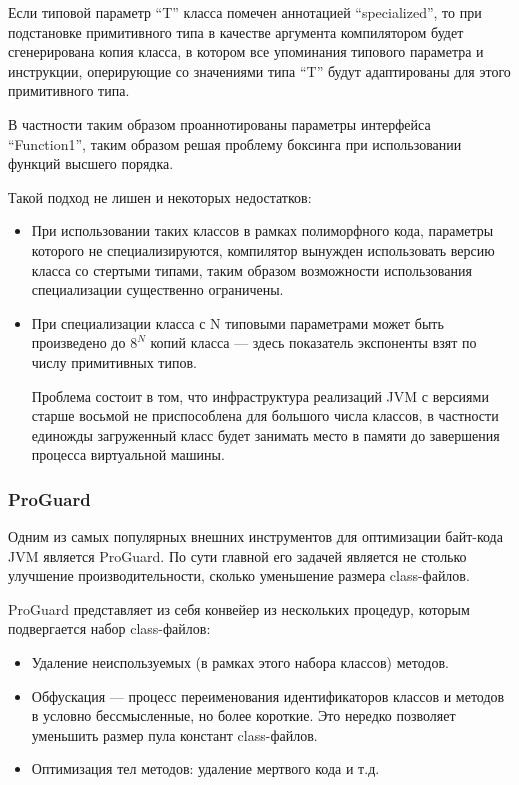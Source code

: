 Если типовой параметр ``T'' класса помечен аннотацией ``specialized'', то при подстановке
примитивного типа в качестве аргумента компилятором будет сгенерирована копия класса, в котором
все упоминания типового параметра и инструкции, оперирующие со значениями типа ``T'' будут
адаптированы для этого примитивного типа.

В частности таким образом проаннотированы параметры интерфейса ``Function1'', таким образом решая
проблему боксинга при использовании функций высшего порядка.

Такой подход не лишен и некоторых недостатков:
\begin{itemize}
    \item При использовании таких классов в рамках полиморфного кода, параметры которого
    не специализируются, компилятор вынужден использовать версию класса со стертыми типами, таким
    образом возможности использования специализации существенно ограничены.
    \item При специализации класса с N типовыми параметрами может быть произведено до $8^N$ копий
    класса --- здесь показатель экспоненты взят по числу примитивных типов.

    Проблема состоит в том, что инфраструктура реализаций JVM с версиями старше восьмой
    не приспособлена для большого числа классов, в частности единожды загруженный класс будет
    занимать место в памяти до завершения процесса виртуальной машины.
\end{itemize}

\subsubsection{ProGuard}
Одним из самых популярных внешних инструментов для оптимизации байт-кода JVM является ProGuard.
По сути главной его задачей является не столько улучшение производительности, сколько уменьшение
размера class-файлов.

ProGuard представляет из себя конвейер из нескольких процедур, которым подвергается набор
class-файлов:
\begin{itemize}
    \item Удаление неиспользуемых (в рамках этого набора классов) методов.
    \item Обфускация --- процесс переименования идентификаторов классов и методов в условно
    бессмысленные, но более короткие. Это нередко позволяет уменьшить размер
    пула констант class-файлов.
    \item Оптимизация тел методов: удаление мертвого кода и т.д.
\end{itemize}


